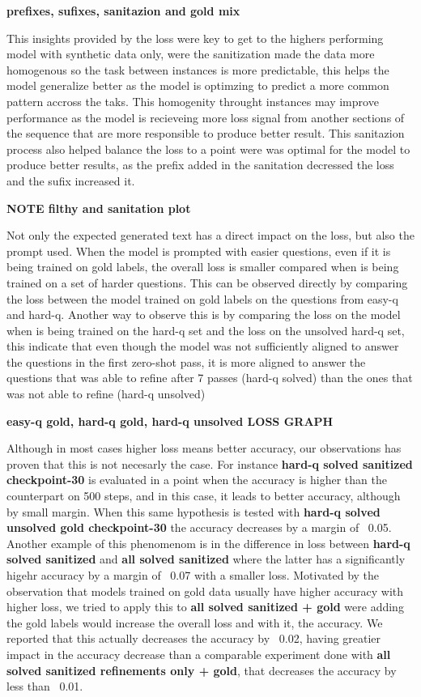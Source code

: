 \documentclass[a4paper,10pt]{article}
\begin{document}
\textbf{prefixes, sufixes, sanitazion and gold mix}


This insights provided by the loss were key to get to the highers performing model with synthetic data only, were the sanitization made the data more homogenous so the task between instances is more predictable, this helps the model generalize better as the model is optimzing to predict a more common pattern accross the taks. This homogenity throught instances may improve performance as the model is recieveing more loss signal from another sections of the sequence that are more responsible to produce better result. This sanitazion process also helped balance the loss to a point were was optimal for the model to produce better results, as the prefix added in the sanitation decressed the loss and the sufix increased it.

\textbf{NOTE filthy and sanitation plot}


Not only the expected generated text has a direct impact on the loss, but also the prompt used. When the model is prompted with easier questions, even if it is being trained on gold labels, the overall loss is smaller compared when is being trained on a set of harder questions. This can be observed directly by comparing the loss between the model trained on gold labels on the questions from easy-q and hard-q. Another way to observe this is by comparing the loss on the model when is being trained on the hard-q set and the loss on the unsolved hard-q set, this indicate that even though the model was not sufficiently aligned to answer the questions in the first zero-shot pass, it is more aligned to answer the questions that was able to refine after 7 passes (hard-q solved) than the ones that was not able to refine (hard-q unsolved)

\textbf{easy-q gold, hard-q gold, hard-q unsolved LOSS GRAPH}


Although in most cases higher loss means better accuracy, our observations has proven that this is not necesarly the case. For instance \textbf{hard-q solved sanitized checkpoint-30} is evaluated in a point when the accuracy is higher than the counterpart on 500 steps, and in this case, it leads to better accuracy, although by small margin. When this same hypothesis is tested with \textbf{hard-q solved unsolved gold checkpoint-30} the accuracy decreases by a margin of ~0.05. Another example of this phenomenom is in the difference in loss between \textbf{hard-q solved sanitized} and \textbf{all solved sanitized} where the latter has a significantly higehr accuracy by a margin of ~0.07 with a smaller loss. Motivated by the observation that models trained on gold data usually have higher accuracy with higher loss, we tried to apply this to \textbf{all solved sanitized + gold} were adding the gold labels would increase the overall loss and with it, the accuracy. We reported that this actually decreases the accuracy by ~0.02, having greatier impact in the accuracy decrease than a comparable experiment done with \textbf{all solved sanitized refinements only + gold}, that decreases the accuracy by less than ~0.01. 
\end{document}
